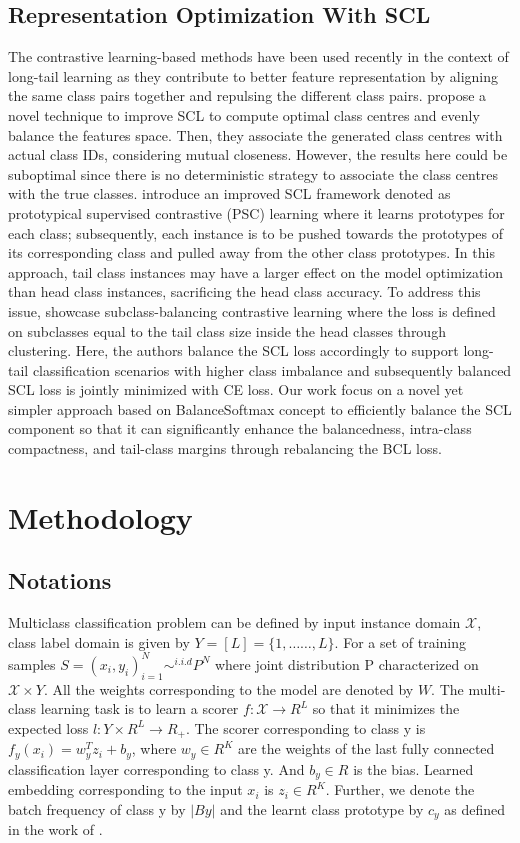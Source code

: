 \subsection{Representation Optimization With SCL }The contrastive learning-based methods have been used recently in the context of long-tail learning as they contribute to better feature representation by aligning the same class pairs together and repulsing the different class pairs. \cite{target} propose a novel technique to improve SCL to compute optimal class centres and evenly balance the features space. Then, they associate the generated class centres with actual class IDs, considering mutual closeness. However, the results here could be suboptimal since there is no deterministic strategy to associate the class centres with the true classes. \cite{prototype} introduce an improved SCL framework denoted as prototypical supervised contrastive (PSC) learning where it learns prototypes for each class; subsequently, each instance is to be pushed towards the prototypes of its corresponding class and pulled away from the other class prototypes. In this approach, tail class instances may have a larger effect on the model optimization than head class instances, sacrificing the head class accuracy. To address this issue, \cite{sub} showcase subclass-balancing contrastive learning where the loss is defined on subclasses equal to the tail class size inside the head classes through clustering. Here, the authors balance the  SCL loss accordingly to support long-tail classification scenarios with higher class imbalance and subsequently balanced SCL loss is jointly minimized with CE loss. Our work focus on a novel yet simpler approach based on BalanceSoftmax concept to efficiently balance the SCL component so that it can significantly enhance the balancedness, intra-class compactness, and tail-class margins through rebalancing the BCL loss. 
\section{Methodology}
\label{sec:formatting}
\subsection{Notations}
   Multiclass classification problem can be defined by input instance domain $\mathcal{X}$, class label domain is given by $ Y=[L]=\{1,……,L\}$. For a set of training samples $ S = {(x_i,y_i)}_{i=1}^N \sim^{i.i.d} P^N  $ where joint distribution P characterized on $\mathcal{X} \times Y$. All the weights corresponding to the model are denoted by $W$. The multi-class learning task is to learn a scorer $f : \mathcal{X} \to R^L$ so that it minimizes the expected loss $l:Y \times R^L \to R_+$.
The scorer corresponding to class y is $f_y(x_i) = w_y^T z_i +b_y$, where $ w_y \in R^K$ are the weights of the last fully connected classification layer corresponding to class y. And $b_y \in R $ is the bias. Learned embedding corresponding to the input $x_i$ is $z_i \in R^K$. Further, we denote the batch frequency of class y by $|By|$ and the learnt class prototype by $c_y$ as defined in the work of \cite{bcl}. 

